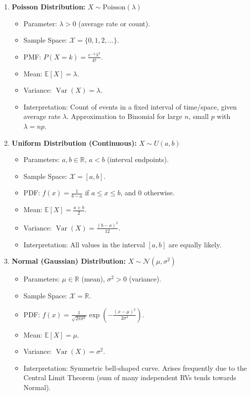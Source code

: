 \documentclass{article}
\newcommand{\R}{\mathbb{R}}    %
\newcommand{\E}{\mathbb{E}}    %
\DeclareMathOperator{\Var}{Var} %
\begin{document}
\begin{enumerate}
    \item \textbf{Poisson Distribution:} $X \sim \text{Poisson}(\lambda)$
        \begin{itemize}
            \item Parameter: $\lambda > 0$ (average rate or count).
            \item Sample Space: $\mathcal{X} = \{0, 1, 2, \dots\}$.
            \item PMF: $P(X=k) = \frac{e^{-\lambda} \lambda^k}{k!}$.
            \item Mean: $\E[X] = \lambda$.
            \item Variance: $\Var(X) = \lambda$.
            \item Interpretation: Count of events in a fixed interval of time/space, given average rate $\lambda$. Approximation to Binomial for large $n$, small $p$ with $\lambda=np$.
        \end{itemize}

    \item \textbf{Uniform Distribution (Continuous):} $X \sim U(a, b)$
        \begin{itemize}
            \item Parameters: $a, b \in \R$, $a < b$ (interval endpoints).
            \item Sample Space: $\mathcal{X} = [a, b]$.
            \item PDF: $f(x) = \frac{1}{b-a}$ if $a \le x \le b$, and $0$ otherwise.
            \item Mean: $\E[X] = \frac{a+b}{2}$.
            \item Variance: $\Var(X) = \frac{(b-a)^2}{12}$.
            \item Interpretation: All values in the interval $[a, b]$ are equally likely.
        \end{itemize}

    \item \textbf{Normal (Gaussian) Distribution:} $X \sim \mathcal{N}(\mu, \sigma^2)$
        \begin{itemize}
            \item Parameters: $\mu \in \R$ (mean), $\sigma^2 > 0$ (variance).
            \item Sample Space: $\mathcal{X} = \R$.
            \item PDF: $f(x) = \frac{1}{\sqrt{2\pi\sigma^2}} \exp\left(-\frac{(x-\mu)^2}{2\sigma^2}\right)$.
            \item Mean: $\E[X] = \mu$.
            \item Variance: $\Var(X) = \sigma^2$.
            \item Interpretation: Symmetric bell-shaped curve. Arises frequently due to the Central Limit Theorem (sum of many independent RVs tends towards Normal).
        \end{itemize}


\end{enumerate}
\end{document}
